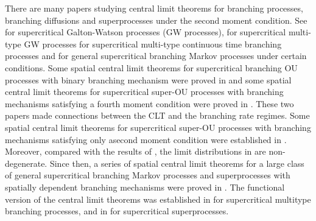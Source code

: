 \documentclass[12pt,a4paper]{amsart}
\theoremstyle{plain}
\theoremstyle{definition}
\numberwithin{equation}{section}
\begin{document}
    There are many papers studying central limit theorems for branching processes, branching diffusions and superprocesses under the second moment condition.
   See   \cite{Heyde1970A-rate, HeydeBrown1871An-invariance, HeydeLeslie1971Improved} for %
   supercritical Galton-Watson processes (GW processes),
    \cite{KestenStigum1966Additional,KestenStigum1966A-limit} for supercritical multi-type %
    GW processes
    \cite{Athreya1969Limit,Athreya1969LimitB,Athreya1971Some} for supercritical multi-type continuous time branching processes and \cite{AsmussenHering1983Branching} for general supercritical branching Markov processes under certain conditions.
Some spatial central limit theorems for   supercritical branching OU processes with binary branching mechanism were proved in \cite{AdamczakMilos2015CLT} and some spatial central limit theorems for supercritical super-OU processes with branching mechanisms satisfying a fourth moment condition were proved in \cite{Milos2012Spatial}.
    These two papers made connections between the CLT and  the branching rate regimes.
Some spatial central limit theorems for supercritical super-OU  processes with branching mechanisms satisfying only asecond moment condition were established in \cite{RenSongZhang2014Central}.
Moreover, compared with the results of \cite{AdamczakMilos2015CLT,Milos2012Spatial}, the limit distributions in \cite{RenSongZhang2014Central} are non-degenerate.
Since then, a series of spatial central limit theorems for a large class of general supercritical branching Markov processes and superprocesses with spatially dependent branching mechanisms
were proved in \cite{RenSongZhang2014CentralB,RenSongZhang2015Central,RenSongZhang2017Central}.
    The functional version of the central limit theorems was established in \cite{Janson2004Functional} for supercritical multitype branching processes, and  in \cite{RenSongZhang2017Functional} for supercritical superprocesses.
\end{document}
